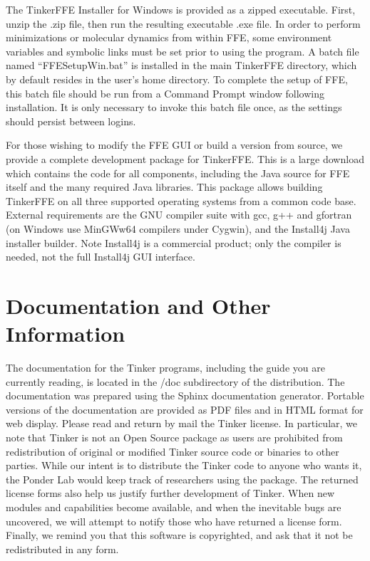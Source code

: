 \documentclass[letterpaper,11pt,english]{sphinxmanual}
\begin{document}
\sphinxAtStartPar
The Tinker\sphinxhyphen{}FFE Installer for Windows is provided as a zipped executable. First, unzip the .zip file, then run the resulting executable .exe file. In order to perform minimizations or molecular dynamics from within FFE, some environment variables and symbolic links must be set prior to using the program. A batch file named “FFESetupWin.bat” is installed in the main Tinker\sphinxhyphen{}FFE directory, which by default resides in the user’s home directory. To complete the setup of FFE, this batch file should be run from a Command Prompt window following installation. It is only necessary to invoke this batch file once, as the settings should persist between logins.

\sphinxAtStartPar
For those wishing to modify the FFE GUI or build a version from source, we provide a complete development package for Tinker\sphinxhyphen{}FFE. This is a large download which contains the code for all components, including the Java source for FFE itself and the many required Java libraries. This package allows building Tinker\sphinxhyphen{}FFE on all three supported operating systems from a common code base. External requirements are the GNU compiler suite with gcc, g++ and gfortran (on Windows use MinGW\sphinxhyphen{}w64 compilers under Cygwin), and the Install4j Java installer builder. Note Install4j is a commercial product; only the compiler is needed, not the full Install4j GUI interface.


\section{Documentation and Other Information}
\label{\detokenize{text/installation:documentation-and-other-information}}
\sphinxAtStartPar
The documentation for the Tinker programs, including the guide you are currently reading, is located in the /doc subdirectory of the distribution. The documentation was prepared using the Sphinx documentation generator. Portable versions of the documentation are provided as PDF files and in HTML format for web display. Please read and return by mail the Tinker license. In particular, we note that Tinker is not an Open Source package as users are prohibited from redistribution of original or modified Tinker source code or binaries to other parties. While our intent is to distribute the Tinker code to anyone who wants it, the Ponder Lab would keep track of researchers using the package. The returned license forms also help us justify further development of Tinker. When new modules and capabilities become available, and when the inevitable bugs are uncovered, we will attempt to notify those who have returned a license form. Finally, we remind you that this software is copyrighted, and ask that it not be redistributed in any form.
\end{document}
